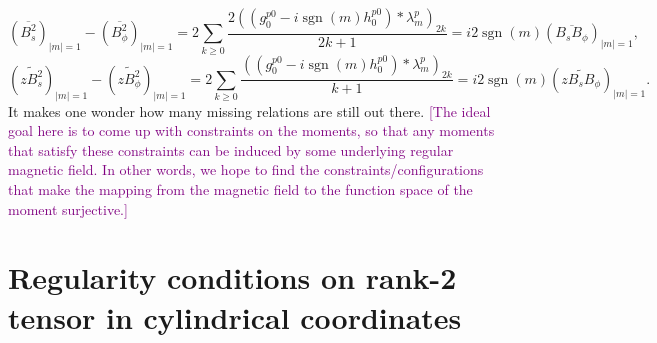 \documentclass[a4paper, 11pt]{article}
\DeclareMathOperator{\sgn}{sgn}
\newcommand{\todoitem}[1]{\textcolor{purple}{[#1]}}
\begin{document}
\begin{equation}\label{eqn:coupling-bss-bpp-bsp-m1}
    \left(\overline{B_s^2}\right)_{|m|=1} - \left(\overline{B_\phi^2}\right)_{|m|=1} = 2 \sum_{k \geq 0} \frac{2((g_0^{p0} - i\sgn(m) h_0^{p0}) * \lambda_m^p)_{2k}}{2k+1} = i 2 \sgn(m) \left(\overline{B_s B_\phi}\right)_{|m|=1},
\end{equation}
\begin{equation}\label{eqn:coupling-bzss-bzpp-bzsp-m1}
    \left(\widetilde{zB_s^2}\right)_{|m|=1} - \left(\widetilde{z B_\phi^2}\right)_{|m|=1} = 2 \sum_{k \geq 0} \frac{((g_0^{p0} - i\sgn(m) h_0^{p0}) * \lambda_m^p)_{2k}}{k+1} = i 2 \sgn(m) \left(\widetilde{z B_s B_\phi}\right)_{|m|=1}.
\end{equation}
It makes one wonder how many missing relations are still out there. \todoitem{The ideal goal here is to come up with constraints on the moments, so that any moments that satisfy these constraints can be induced by some underlying regular magnetic field. In other words, we hope to find the constraints/configurations that make the mapping from the magnetic field to the function space of the moment surjective.}

\clearpage

\appendix

\section{Regularity conditions on rank-2 tensor in cylindrical coordinates}
\end{document}
